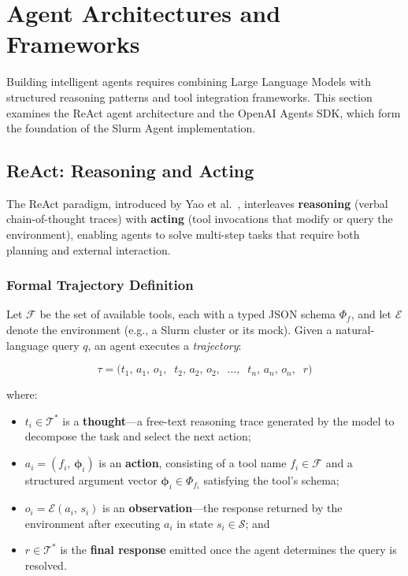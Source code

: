 \section{Agent Architectures and Frameworks}
\label{sec:agent-architectures}

Building intelligent agents requires combining Large Language Models with structured reasoning patterns and tool integration frameworks. This section examines the ReAct agent architecture and the OpenAI Agents SDK, which form the foundation of the Slurm Agent implementation.

\subsection{ReAct: Reasoning and Acting}

The ReAct paradigm, introduced by Yao et al.~\cite{yao2022react}, interleaves \textbf{reasoning} (verbal chain-of-thought traces) with \textbf{acting} (tool invocations that modify or query the environment), enabling agents to solve multi-step tasks that require both planning and external interaction.

\subsubsection{Formal Trajectory Definition}

Let $\mathcal{F}$ be the set of available tools, each with a typed JSON schema $\Phi_f$, and let $\mathcal{E}$ denote the environment (e.g., a Slurm cluster or its mock). Given a natural-language query $q$, an agent executes a \emph{trajectory}:

\begin{equation}
    \tau = \bigl(t_1,\, a_1,\, o_1,\;\; t_2,\, a_2,\, o_2,\;\; \ldots,\;\; t_n,\, a_n,\, o_n,\;\; r\bigr)
    \label{eq:react-trajectory}
\end{equation}

where:
\begin{itemize}
    \item $t_i \in \mathcal{T}^*$ is a \textbf{thought}---a free-text reasoning trace generated by the model to decompose the task and select the next action;
    \item $a_i = (f_i,\, \boldsymbol{\phi}_i)$ is an \textbf{action}, consisting of a tool name $f_i \in \mathcal{F}$ and a structured argument vector $\boldsymbol{\phi}_i \in \Phi_{f_i}$ satisfying the tool's schema;
    \item $o_i = \mathcal{E}(a_i,\, s_i)$ is an \textbf{observation}---the response returned by the environment after executing $a_i$ in state $s_i \in \mathcal{S}$; and
    \item $r \in \mathcal{T}^*$ is the \textbf{final response} emitted once the agent determines the query is resolved.
\end{itemize}

